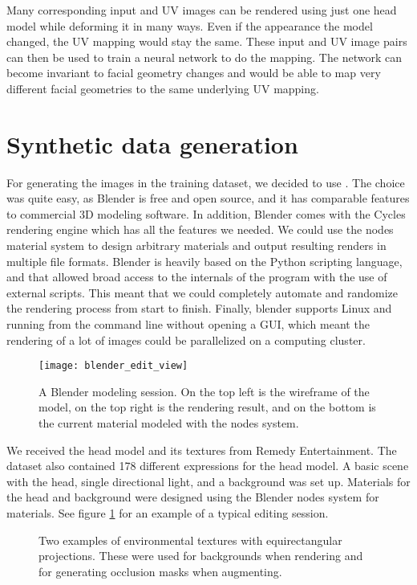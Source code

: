 Many corresponding input and UV images can be rendered using just one head model while deforming it in many ways. Even if the appearance the model changed, the UV mapping would stay the same. These input and UV image pairs can then be used to train a neural network to do the mapping. The network can become invariant to facial geometry changes and would be able to map very different facial geometries to the same underlying UV mapping.

\section{Synthetic data generation}
\label{sec:syn_data_gen}

For generating the images in the training dataset, we decided to use \textcite{blender}. The choice was quite easy, as Blender is free and open source, and it has comparable features to commercial 3D modeling software. In addition, Blender comes with the Cycles rendering engine which has all the features we needed. We could use the nodes material system to design arbitrary materials and output resulting renders in multiple file formats. Blender is heavily based on the Python scripting language, and that allowed broad access to the internals of the program with the use of external scripts. This meant that we could completely automate and randomize the rendering process from start to finish. Finally, blender supports Linux and running from the command line without opening a \ac{GUI}, which meant the rendering of a lot of images could be parallelized on a computing cluster.

\begin{figure}
    \texttt{[image: blender\_edit\_view]}
    \caption[Blender modeling session]{A Blender modeling session. On the top left is the wireframe of the model, on the top right is the rendering result, and on the bottom is the current material modeled with the nodes system.}
    \label{fig:blender_edit_view_1}
\end{figure}

We received the head model and its textures from Remedy Entertainment. The dataset also contained 178 different expressions for the head model. A basic scene with the head, single directional light, and a background was set up. Materials for the head and background were designed using the Blender nodes system for materials. See figure \ref{fig:blender_edit_view_1} for an example of a typical editing session.

\begin{figure}
    \hfill
    \hfill
    \caption[Environmental textures]{Two examples of environmental textures with equirectangular projections. These were used for backgrounds when rendering and for generating occlusion masks when augmenting.}
    \label{fig:env_1}
\end{figure}

